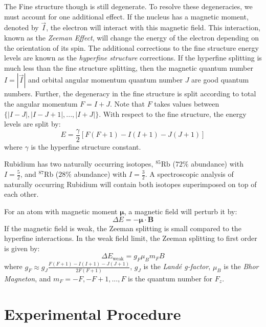 \documentclass[12pt]{article}
\newcommand{\RbEF}{$^{85}\text{Rb}$ }
\newcommand{\RbES}{$^{87}\text{Rb}$ }
\begin{document}
	The Fine structure though is still degenerate. To resolve these degeneracies, we must account for one additional effect. If the nucleus has a magnetic moment, denoted by $\vec{I}$, the electron will interact with this magnetic field. This interaction, known as the \emph{Zeeman Effect}, will change the energy of the electron depending on the orientation of its spin. The additional corrections to the fine structure energy levels are known as the \emph{hyperfine structure} corrections. If the hyperfine splitting is much less than the fine structure splitting, then the magnetic quantum number $I=|\vec{I}|$ and orbital angular momentum quantum number $J$ are good quantum numbers. Further, the degeneracy in the fine structure is split according to total the angular momentum $F=I+J$. Note that $F$ takes values between $\{|I-J|, |I-J+1|,...,|I+J|\}$. With respect to the fine structure, the energy levels are split by:
	\begin{equation}
		\label{hyperfineSplitting}
		E = \frac{\gamma}{2}\left[ F(F+1) - I(I+1) - J(J+1) \right]
	\end{equation}
	where $\gamma$ is the hyperfine structure constant.
	
	Rubidium has two naturally occurring isotopes, \RbEF ($72\%$ abundance) with $I=\frac{5}{2}$, and \RbES ($28\%$ abundance) with $I=\frac{3}{2}$. A spectroscopic analysis of naturally occurring Rubidium will contain both isotopes superimposed on top of each other. 
	
	For an atom with magnetic moment $\bm{\mu}$, a magnetic field will perturb it by:
	\begin{equation}
		\Delta E = - \bm{\mu} \cdot \mathbf{B} 
	\end{equation}
	If the magnetic field is weak, the Zeeman splitting is small compared to the hyperfine interactions. In the weak field limit, the Zeeman splitting to first order is given by:
	\begin{equation}
		\Delta E_{\text{weak}} = g_F \mu_B m_F B
		\label{zeemanWeak}
	\end{equation}
	where $g_F \approx g_J \frac{F(F+1)-I(I+1)-J(J+1)}{2F(F+1)}$, $g_J$ is the \emph{Land\'e g-factor}, $\mu_B$ is the \emph{Bhor Magneton}, and $m_F=-F,-F+1,...,F$ is the quantum number for $F_z$. 		
	 
	\section{Experimental Procedure}
\end{document}
